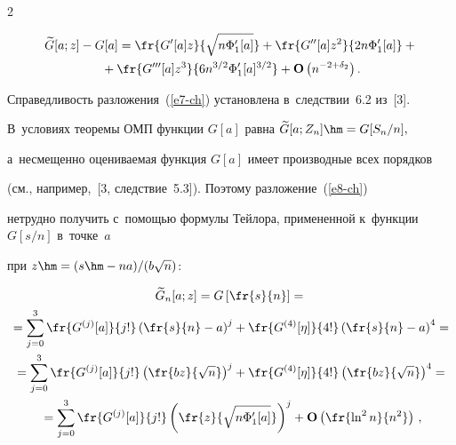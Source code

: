 \begin{multicols}{2}
\noindent


\begin{multline}


 \widetilde{G}[a;z]-G[a]=


 \fr{G'[a] z}{\sqrt{n\Phi'_1[a]}}


 + \fr{G''[a] z^2}{2 n\Phi'_1[a]}+{}\\


{} + \fr{G'''[a] z^3}{6 n^{3/2}\Phi'_1[a]^{3/2}}


 + \mathbf{O}\left(n^{ -2+\delta_2}\right).


 \label{e8-ch}


 \end{multline}


 Справедливость разложения~(\ref{e7-ch}) установлена в~следствии~6.2 из~[3].


 В~условиях теоремы ОМП функции $G[a]$ равна $\widetilde{G}[a;Z_n]\hm=G[S_n/n],$


 а~несмещенно оцениваемая функция $G[a]$ имеет производные всех порядков 


 (см., например,~[3, следствие~5.3]). Поэтому разложение~(\ref{e8-ch}) 


 нетрудно получить с~по\-мощью формулы Тейлора, примененной к~функции $G[s/n]$ в~точке~$a$ 


 при $z\hm=(s\hm-na)/(b\sqrt{n})$:


 \begin{multline*}


 \widetilde{G}_n[a;z]=G\left[\fr{s}{n}\right]


  ={}\\


  {}=\sum\limits_{j=0}^3 \fr{G^{(j)}[a]}{j!}\left(\fr{s}{n}-a\right)^j+


   \fr{G^{(4)}[\eta]}{4!}\left(\fr{s}{n}-a\right)^4={}\\


{}=\sum\limits_{j=0}^3 \fr{G^{(j)}[a]}{j!}\left(\fr{b z}{\sqrt{n}}\right)^j+


   \fr{G^{(4)}[\eta]}{4!}\left(\fr{b z}{\sqrt{n}}\right)^4={}


\\


  {}=\sum\limits_{j=0}^3 \fr{G^{(j)}[a]}{j!}


  \left(\fr{z}{\sqrt{n \Phi'_1[a]}}\right)^j+


   {\bf O}\left(\fr{\ln^2 n}{n^2}\right)\,,


 \end{multline*}



\end{multicols}
